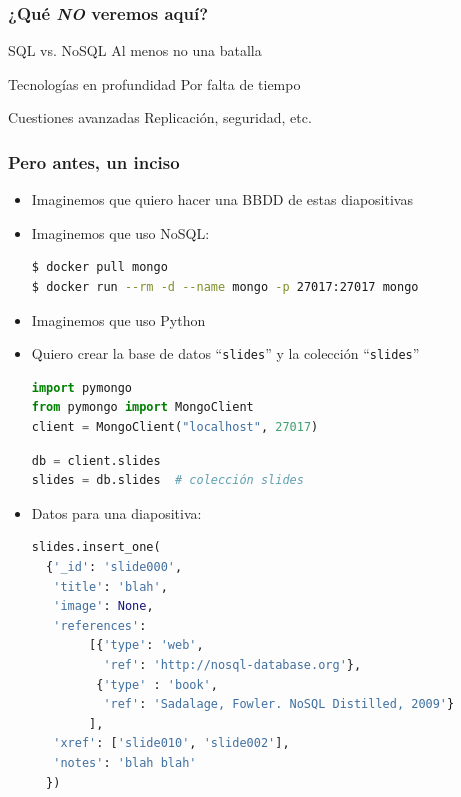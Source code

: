 \documentclass[14pt]{beamer}
\begin{document}
\begin{frame}
  \frametitle{¿Qué {\em NO\/} veremos aquí?}
  \begin{alertblock}{SQL vs. NoSQL}
    Al menos no una batalla
  \end{alertblock}
  \begin{alertblock}{Tecnologías en profundidad}
    Por falta de tiempo
  \end{alertblock}
  \begin{alertblock}{Cuestiones avanzadas}
    Replicación, seguridad, etc.
  \end{alertblock}
\end{frame}

\begin{frame}
  \frametitle{Pero antes, un inciso}
  \begin{itemize}
  \item Imaginemos que quiero hacer una BBDD de estas diapositivas
  \item Imaginemos que uso NoSQL:
\begin{lstlisting}[language=bash]
$ docker pull mongo
$ docker run --rm -d --name mongo -p 27017:27017 mongo
\end{lstlisting}
  \item Imaginemos que uso Python

    \framebreak

  \item Quiero crear la base de datos ``{\tt slides}'' y la colección
    ``{\tt slides}''
\begin{lstlisting}[language=python]
import pymongo
from pymongo import MongoClient
client = MongoClient("localhost", 27017)
\end{lstlisting}

\begin{lstlisting}[language=python]
db = client.slides
slides = db.slides  # colección slides
\end{lstlisting}

    \framebreak

\item Datos para una diapositiva:

\begin{lstlisting}[language=python]
slides.insert_one(
  {'_id': 'slide000',
   'title': 'blah',
   'image': None,
   'references':
        [{'type': 'web',
          'ref': 'http://nosql-database.org'},
         {'type' : 'book',
          'ref': 'Sadalage, Fowler. NoSQL Distilled, 2009'}
        ],
   'xref': ['slide010', 'slide002'],
   'notes': 'blah blah'
  })
\end{lstlisting}


\end{itemize}
\end{frame}
\end{document}
